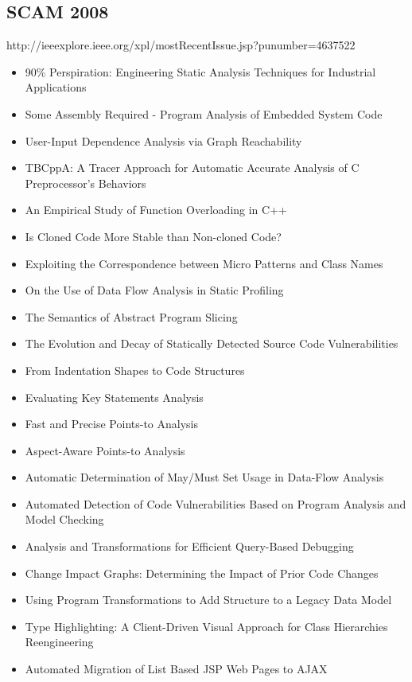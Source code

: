 \subsection{SCAM 2008}

http://ieeexplore.ieee.org/xpl/mostRecentIssue.jsp?punumber=4637522

{\small
\begin{itemize}[itemsep=-1ex]
  \item 90\% Perspiration: Engineering Static Analysis Techniques for Industrial Applications
  \item Some Assembly Required - Program Analysis of Embedded System Code
  \item User-Input Dependence Analysis via Graph Reachability
  \item TBCppA: A Tracer Approach for Automatic Accurate Analysis of C Preprocessor's Behaviors
  \item An Empirical Study of Function Overloading in C++
  \item Is Cloned Code More Stable than Non-cloned Code?
  \item Exploiting the Correspondence between Micro Patterns and Class Names
  \item On the Use of Data Flow Analysis in Static Profiling
  \item The Semantics of Abstract Program Slicing
  \item The Evolution and Decay of Statically Detected Source Code Vulnerabilities
  \item From Indentation Shapes to Code Structures
  \item Evaluating Key Statements Analysis
  \item Fast and Precise Points-to Analysis
  \item Aspect-Aware Points-to Analysis
  \item Automatic Determination of May/Must Set Usage in Data-Flow Analysis
  \item Automated Detection of Code Vulnerabilities Based on Program Analysis and Model Checking
  \item Analysis and Transformations for Efficient Query-Based Debugging
  \item Change Impact Graphs: Determining the Impact of Prior Code Changes
  \item Using Program Transformations to Add Structure to a Legacy Data Model
  \item Type Highlighting: A Client-Driven Visual Approach for Class Hierarchies Reengineering
  \item Automated Migration of List Based JSP Web Pages to AJAX

\end{itemize}}
